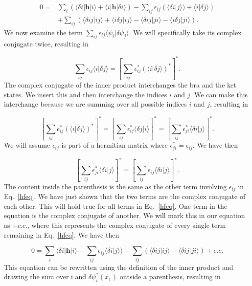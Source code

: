 \documentclass[a4paper,norsk,11pt,twoside]{report}
\begin{document}
\begin{align}
0 = & \sum_i (
 \langle \delta i | \textbf{h} | i \rangle
 + \langle i | \textbf{h} | \delta i \rangle )
 - \sum_{ij} \epsilon_{ij} ( \langle \delta i | j \rangle)
+ \langle i | \delta j \rangle )
  \nonumber \\ &
 + \sum_{ij} (
  \langle \delta i j | i j \rangle 
 + \langle  i \delta j | i j \rangle
 - \langle \delta i j | j i \rangle 
 - \langle i \delta j | j i \rangle ) .
 \label{hfeq}
\end{align}
We now examine the term $\sum_{ij} \epsilon_{ij} \langle \psi_i | \delta \psi_j \rangle$. 
We will specifically take its complex conjugate twice, resulting in

\begin{equation}
\sum_{ij} \epsilon_{ij} \langle i | \delta j \rangle
= \left[ \sum_{ij} \epsilon_{ij}^* \left( \langle i | \delta j \rangle \right)^* \right]^* .
\end{equation}
The complex conjugate of the inner product interchanges the bra and
the ket states. We insert this and then interchange the indices $i$ and $j$. We
can make this interchange because we are summing over all possible indices $i$
and $j$, resulting in

\begin{equation}
\left[ \sum_{ij} \epsilon_{ij}^* \left( \langle i | \delta j \rangle \right)^* \right]^* 
= \left[ \sum_{ij} \epsilon_{ij}^*  \langle \delta j | i \rangle \right]^*
=  \left[ \sum_{ij} \epsilon_{ji}^*  \langle \delta i | j \rangle \right]^* .
\end{equation}
We will assume $\epsilon_{ij}$ is part of a hermitian matrix where $\epsilon_{ji}^* = \epsilon_{ij}$. 
We have then 

\begin{equation}
\left[ \sum_{ij} \epsilon_{ji}^*  \langle \delta i | j \rangle \right]^* = \left[ \sum_{ij} \epsilon_{ij} \langle \delta i | j \rangle \right]^* .
\end{equation}
The content inside the parenthesis is the same as the other term
involving $\epsilon_{ij}$ in Eq.~\eqref{hfeq}. We have just shown that
the two terms are the complex conjugate of each other. This will hold
true for all terms in Eq.~\eqref{hfeq}. One term in the equation
is the complex conjugate of another. We will mark this in our equation
as $+ c.c.$, where this represents the complex conjugate of every
single term remaining in Eq.~\eqref{hfeq}. We have then

\begin{equation}
0 =  \sum_i 
 \langle \delta i | \textbf{h} | i \rangle
 - \sum_{ij} \epsilon_{ij} \langle \delta i | j \rangle)
 + \sum_{ij} (
 \langle \delta i j | i j \rangle 
 - \langle \delta i j | j i \rangle  ) + c.c .
\end{equation}
This equation can be rewritten using the definition of the inner product and drawing the sum over i and $\delta \psi_i^*(x_1)$ outside a parenthesis, resulting in 
\end{document}

